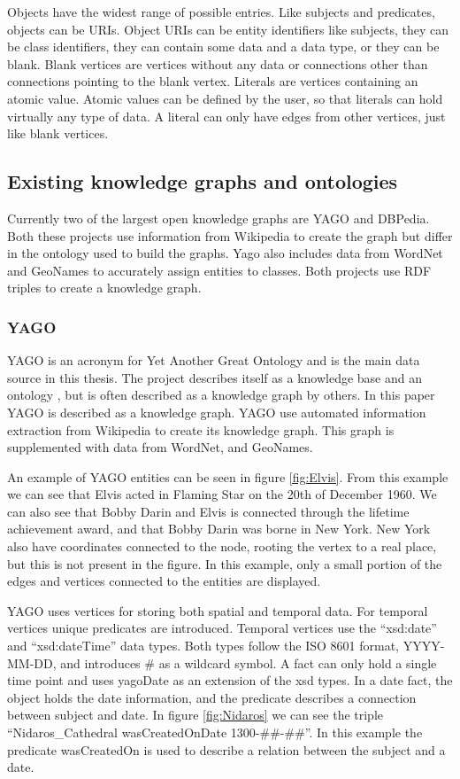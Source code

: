 Objects have the widest range of possible entries. Like subjects and predicates, objects can be URIs. Object URIs can be entity identifiers like subjects, they can be class identifiers, they can contain some data and a data type, or they can be blank. Blank vertices are vertices without any data or connections other than connections pointing to the blank vertex. Literals are vertices containing an atomic value. Atomic values can be defined by the user, so that literals can hold virtually any type of data. A literal can only have edges from other vertices, just like blank vertices.

\subsection{Existing knowledge graphs and ontologies}
Currently two of the largest open knowledge graphs are YAGO and DBPedia. Both these projects use information from Wikipedia to create the graph but differ in the ontology used to build the graphs. Yago also includes data from WordNet and GeoNames to accurately assign entities to classes. Both projects use RDF triples to create a knowledge graph.

\subsubsection{YAGO}
YAGO is an acronym for Yet Another Great Ontology and is the main data source in this thesis. The project describes itself as a knowledge base\cite{yago} and an ontology \cite{mahdisoltani:hal-01699874}, but is often described as a knowledge graph by others. In this paper YAGO is described as a knowledge graph. YAGO use automated information extraction from Wikipedia to create its knowledge graph. This graph is supplemented with data from WordNet, and GeoNames.

An example of YAGO entities can be seen in figure \ref{fig:Elvis}. From this example we can see that Elvis acted in Flaming Star on the 20th of December 1960. We can also see that Bobby Darin and Elvis is connected through the lifetime achievement award, and that Bobby Darin was borne in New York. New York also have coordinates connected to the node, rooting the vertex to a real place, but this is not present in the figure. In this example, only a small portion of the edges and vertices connected to the entities are displayed.

YAGO uses vertices for storing both spatial and temporal data. For temporal vertices unique predicates\cite{yago} are introduced. Temporal vertices use the ``xsd:date'' and ``xsd:dateTime'' data types. Both types follow the ISO 8601 format, YYYY-MM-DD, and introduces \# as a wildcard symbol. A fact can only hold a single time point and uses yagoDate as an extension of the xsd types\cite{yago}. In a date fact, the object holds the date information, and the predicate describes a connection between subject and date. In figure \ref{fig:Nidaros} we can see the triple ``Nidaros\_Cathedral wasCreatedOnDate 1300-\#\#-\#\#''. In this example the predicate wasCreatedOn is used to describe a relation between the subject and a date.


